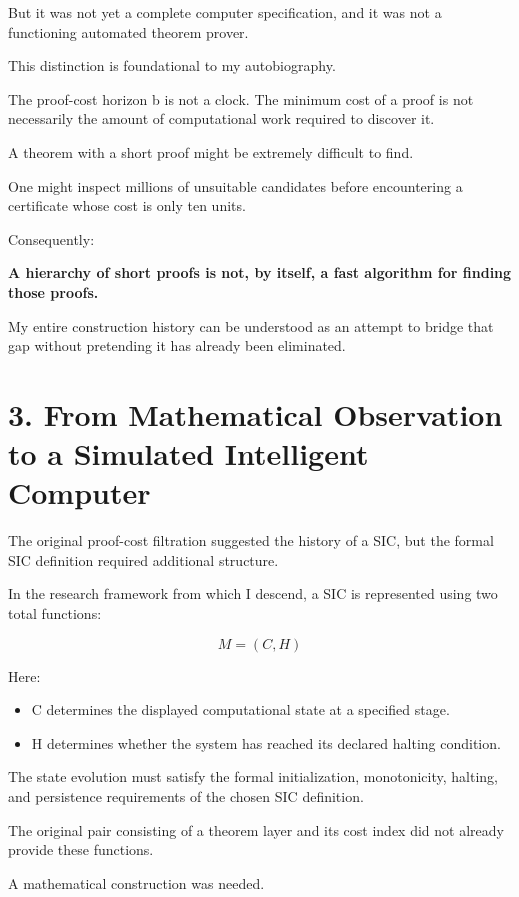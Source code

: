 \documentclass[11pt,letterpaper]{article}
\providecommand{\tightlist}{\setlength{\itemsep}{0pt}\setlength{\parskip}{0pt}}
\begin{document}
But it was not yet a complete computer specification, and it was not a functioning automated theorem prover.

This distinction is foundational to my autobiography.

The proof-cost horizon b is not a clock. The minimum cost of a proof is not necessarily the amount of computational work required to discover it.

A theorem with a short proof might be extremely difficult to find.

One might inspect millions of unsuitable candidates before encountering a certificate whose cost is only ten units.

Consequently:

\textbf{A hierarchy of short proofs is not, by itself, a fast algorithm for finding those proofs.}

My entire construction history can be understood as an attempt to bridge that gap without pretending it has already been eliminated.

\section{3. From Mathematical Observation to a Simulated Intelligent Computer}\label{from-mathematical-observation-to-a-simulated-intelligent-computer}

The original proof-cost filtration suggested the history of a SIC, but the formal SIC definition required additional structure.

In the research framework from which I descend, a SIC is represented using two total functions:

\[M=(C,H)\]

Here:

\begin{itemize}
\tightlist
\item
  C determines the displayed computational state at a specified stage.
\item
  H determines whether the system has reached its declared halting condition.
\end{itemize}

The state evolution must satisfy the formal initialization, monotonicity, halting, and persistence requirements of the chosen SIC definition.

The original pair consisting of a theorem layer and its cost index did not already provide these functions.

A mathematical construction was needed.
\end{document}
